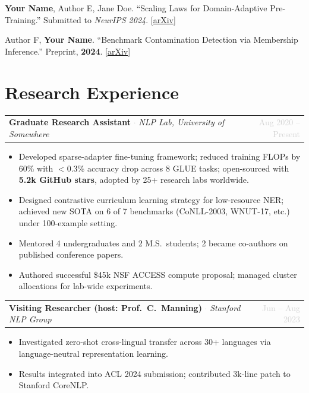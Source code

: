 \documentclass[10pt, letterpaper]{article}
\makeatletter
\newcommand{\entry}[3]{%
  \begin{tabularx}{\linewidth}{@{}X r@{}}
    \textbf{#1} \textcolor{lightgray}{$\cdot$} \textit{#2} &
    {\small\textcolor{lightgray}{#3}}
  \end{tabularx}\vspace{1pt}%
}
\makeatother
\begin{document}
\noindent{\small\textit{\textcolor{lightgray}{Under Review / Preprints:}}}
\begin{enumerate}[label={\small[\arabic*]}, itemsep=2pt, topsep=1pt, start=6]
  \item \textbf{Your Name}, Author E, Jane Doe.
    ``Scaling Laws for Domain-Adaptive Pre-Training.''
    Submitted to \textit{NeurIPS 2024}.
    [\href{https://arxiv.org/}{arXiv}]

  \item Author F, \textbf{Your Name}.
    ``Benchmark Contamination Detection via Membership Inference.''
    Preprint, \textbf{2024}. [\href{https://arxiv.org/}{arXiv}]
\end{enumerate}

\section{Research Experience}

\entry{Graduate Research Assistant}{NLP Lab, University of Somewhere}{Aug 2020 -- Present}
\begin{itemize}
  \item Developed sparse-adapter fine-tuning framework; reduced training FLOPs by 60\% with $<$0.3\% accuracy drop across 8 GLUE tasks; open-sourced with \textbf{5.2k GitHub stars}, adopted by 25+ research labs worldwide.
  \item Designed contrastive curriculum learning strategy for low-resource NER; achieved new SOTA on 6 of 7 benchmarks (CoNLL-2003, WNUT-17, etc.) under 100-example setting.
  \item Mentored 4 undergraduates and 2 M.S.\ students; 2 became co-authors on published conference papers.
  \item Authored successful \$45k NSF ACCESS compute proposal; managed cluster allocations for lab-wide experiments.
\end{itemize}
\vspace{3pt}

\entry{Visiting Researcher (host: Prof.\ C.\ Manning)}{Stanford NLP Group}{Jun -- Aug 2023}
\begin{itemize}
  \item Investigated zero-shot cross-lingual transfer across 30+ languages via language-neutral representation learning.
  \item Results integrated into ACL 2024 submission; contributed 3k-line patch to Stanford CoreNLP.
\end{itemize}
\vspace{3pt}
\end{document}
